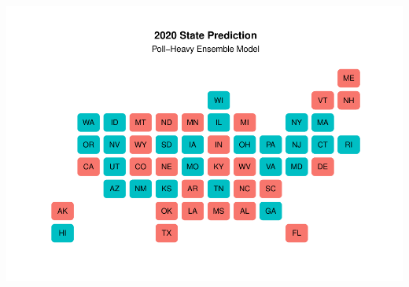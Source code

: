 \documentclass[
]{article}
\begin{document}
\includegraphics{blog_pred_files/figure-latex/unnamed-chunk-4-1.pdf}
\end{document}
